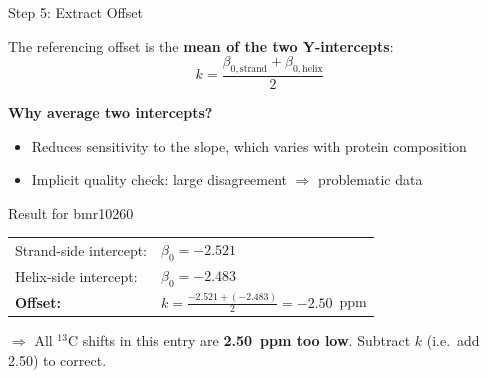 \documentclass[aspectratio=169,11pt]{beamer}
\begin{document}
\begin{frame}[shrink=10]{Step 5: Extract Offset}

The referencing offset is the \textbf{mean of the two Y-intercepts}:
\[
  \boxed{k = \frac{\beta_{0,\text{strand}} + \beta_{0,\text{helix}}}{2}}
\]

\medskip
\textbf{Why average two intercepts?}
\begin{itemize}\setlength\itemsep{1pt}
  \item Reduces sensitivity to the slope, which varies with protein composition
  \item Implicit quality check: large disagreement $\Rightarrow$ problematic data
\end{itemize}

\medskip
\begin{exampleblock}{Result for bmr10260}
\begin{tabular}{ll}
Strand-side intercept: & $\beta_0 = -2.521$ \\
Helix-side intercept:  & $\beta_0 = -2.483$ \\[4pt]
\textbf{Offset:} & $k = \frac{-2.521 + (-2.483)}{2} = \mathbf{-2.50}$~ppm \\
\end{tabular}

\medskip
$\Rightarrow$ All ${}^{13}$C shifts in this entry are \textbf{2.50~ppm too low}.
Subtract $k$ (i.e.\ add 2.50) to correct.
\end{exampleblock}
\end{frame}
\end{document}
